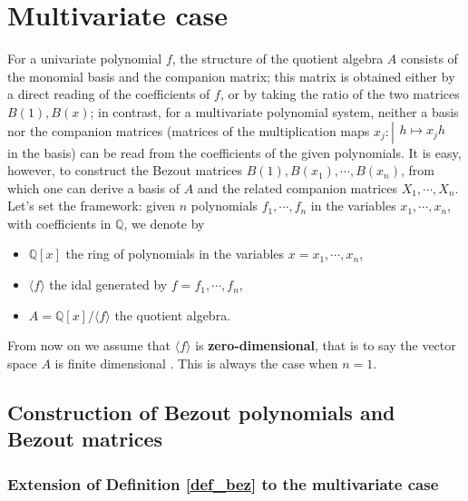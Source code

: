 \documentclass{standalone}
\begin{document}
\section{Multivariate case}
\label{multivariate}

For a univariate polynomial $f$, the structure of the quotient algebra $A$ consists of the monomial basis and the companion matrix; this matrix is obtained either by a direct reading of the coefficients of $f$, or by taking the ratio of the two matrices $B(1), B(x)$; in contrast, for a multivariate polynomial system, neither a basis nor the companion matrices (matrices of the multiplication maps
$x_j : \left\vert
\begin{array}{c}
h \mapsto x_jh
\end{array}
\right.$ in the basis) can be read from the coefficients of the given polynomials. It is easy, however, to construct the Bezout matrices $B(1), B(x_1), \cdots, B(x_n)$, from which one can derive a basis of $A$ and the related companion matrices $X_1,\cdots, X_n$. 
Let's set the framework: given $n$ polynomials $f_1,\cdots, f_n$ in the variables $x_1,\cdots, x_n$, with coefficients in $\mathbb{Q}$, we denote by
\begin{itemize}
\item $\mathbb{Q}[x]$ the ring of polynomials in the variables $x = x_1,\cdots, x_n$,
\item $\langle f \rangle$ the idal generated by $f = f_1,\cdots, f_n$,
\item $A = \mathbb{Q}[x]/\langle f\rangle$ the quotient algebra.
\end{itemize}
From now on we assume that $\langle f\rangle$ is {\bf zero-dimensional}, that is to say the vector space $A$ is finite dimensional \cite[p.~234]{clo}. This is always the case when $n = 1$.

\subsection{Construction of Bezout polynomials and Bezout matrices}

\subsubsection{Extension of Definition \ref{def_bez} to the multivariate case}
\end{document}
